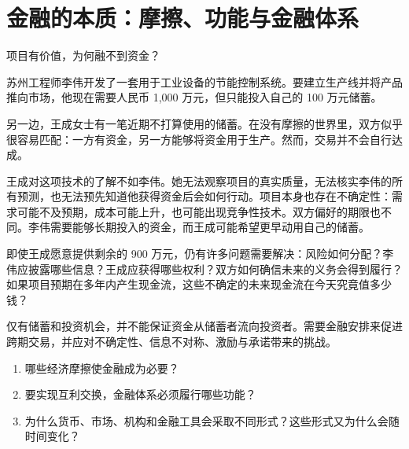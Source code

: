 \chapter{金融的本质：摩擦、功能与金融体系}
\label{chap:The_Essence_of_Finance_Frictions_Functions_and_the_Financial_System}

\begin{openingcase}{项目有价值，为何融不到资金？}

苏州工程师李伟开发了一套用于工业设备的节能控制系统。要建立生产线并将产品推向市场，他现在需要人民币 1,000 万元，但只能投入自己的 100 万元储蓄。

另一边，王成女士有一笔近期不打算使用的储蓄。在没有摩擦的世界里，双方似乎很容易匹配：一方有资金，另一方能够将资金用于生产。然而，交易并不会自行达成。

王成对这项技术的了解不如李伟。她无法观察项目的真实质量，无法核实李伟的所有预测，也无法预先知道他获得资金后会如何行动。项目本身也存在不确定性：需求可能不及预期，成本可能上升，也可能出现竞争性技术。双方偏好的期限也不同。李伟需要能够长期投入的资金，而王成可能希望更早动用自己的储蓄。

即使王成愿意提供剩余的 900 万元，仍有许多问题需要解决：风险如何分配？李伟应披露哪些信息？王成应获得哪些权利？双方如何确信未来的义务会得到履行？如果项目预期在多年内产生现金流，这些不确定的未来现金流在今天究竟值多少钱？

仅有储蓄和投资机会，并不能保证资金从储蓄者流向投资者。需要金融安排来促进跨期交易，并应对不确定性、信息不对称、激励与承诺带来的挑战。

\end{openingcase}

\begin{tcolorbox}[
  enhanced,
  colback=FinanceBlue!6,
  colframe=FinanceBlue,
  boxrule=0.6pt,
  sharp corners,
  left=8pt,
  right=8pt,
  top=7pt,
  bottom=7pt,
  before skip=1em,
  after skip=1.6em,
  title=\textbf{核心问题},
  coltitle=white,
  colbacktitle=FinanceBlue,
  fonttitle=\bfseries,
  attach boxed title to top left={xshift=6pt,yshift=-2mm},
  boxed title style={
    boxrule=0pt,
    sharp corners,
    left=5pt,
    right=5pt,
    top=2pt,
    bottom=2pt
  }
]
\begin{enumerate}[
  leftmargin=*,
  label=\textcolor{FinanceBlue}{\textbf{\arabic*.}},
  itemsep=0.55em,
  topsep=0.2em
]
\item 哪些经济摩擦使金融成为必要？
\item 要实现互利交换，金融体系必须履行哪些功能？
\item 为什么货币、市场、机构和金融工具会采取不同形式？这些形式又为什么会随时间变化？
\end{enumerate}
\end{tcolorbox}

